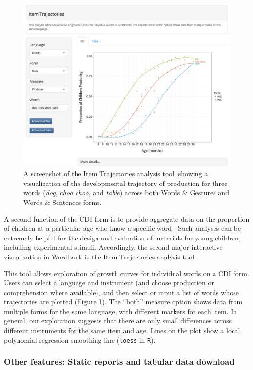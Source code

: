 \documentclass[man,noapacite]{apa}
\begin{document}
\begin{figure}[h!]
\includegraphics[width=6in]{figures/itemsapp.png}
\caption{\label{fig:items} A screenshot of the Item Trajectories analysis tool, showing a visualization of the developmental trajectory of production for three words (\emph{dog}, \emph{choo choo}, and \emph{table}) across both Words \& Gestures and Words \& Sentences forms.}
\end{figure}

A second function of the CDI form is to provide aggregate data on the proportion of children at a particular age who know a specific word \cite{dale1996,jorgensen2010}. Such analyses can be extremely helpful for the design and evaluation of materials for young children, including experimental stimuli. Accordingly, the second major interactive visualization in Wordbank is the Item Trajectories analysis tool. 

This tool allows exploration of growth curves for individual words on a CDI form. Users can select a language and instrument (and choose production or comprehension where available), and then select or input a list of words whose trajectories are plotted (Figure \ref{fig:items}). The ``both'' measure option shows data from multiple forms for the same language, with different markers for each item. In general, our exploration suggests that there are only small differences across different instruments for the same item and age. Lines on the plot show a local polynomial regression smoothing line (\texttt{loess} in \texttt{R}). 

\subsubsection{Other features: Static reports and tabular data download}
\end{document}
